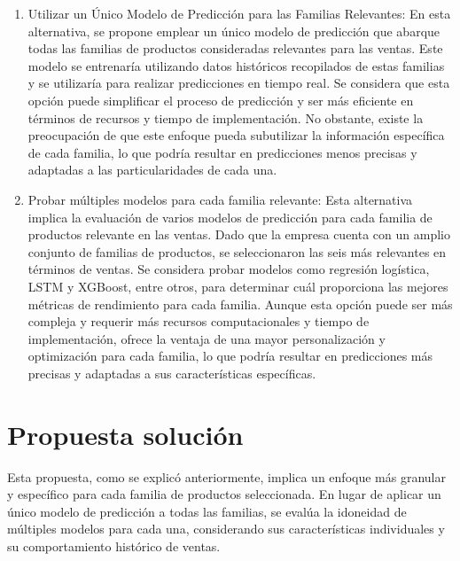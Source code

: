 \begin{enumerate}
	\item Utilizar un Único Modelo de Predicción para las Familias Relevantes: En esta alternativa, se propone emplear un único modelo de predicción que abarque todas las familias de productos consideradas relevantes para las ventas. Este modelo se entrenaría utilizando datos históricos recopilados de estas familias y se utilizaría para realizar predicciones en tiempo real. Se considera que esta opción puede simplificar el proceso de predicción y ser más eficiente en términos de recursos y tiempo de implementación. No obstante, existe la preocupación de que este enfoque pueda subutilizar la información específica de cada familia, lo que podría resultar en predicciones menos precisas y adaptadas a las particularidades de cada una.
	
	\item Probar múltiples modelos para cada familia relevante: Esta alternativa implica la evaluación de varios modelos de predicción para cada familia de productos relevante en las ventas. Dado que la empresa cuenta con un amplio conjunto de familias de productos, se seleccionaron las seis más relevantes en términos de ventas. Se considera probar modelos como regresión logística, LSTM y XGBoost, entre otros, para determinar cuál proporciona las mejores métricas de rendimiento para cada familia. Aunque esta opción puede ser más compleja y requerir más recursos computacionales y tiempo de implementación, ofrece la ventaja de una mayor personalización y optimización para cada familia, lo que podría resultar en predicciones más precisas y adaptadas a sus características específicas.
\end{enumerate}




\section{Propuesta solución}
Esta propuesta, como se explicó anteriormente, implica un enfoque más granular y específico para cada familia de productos seleccionada. En lugar de aplicar un único modelo de predicción a todas las familias, se evalúa la idoneidad de múltiples modelos para cada una, considerando sus características individuales y su comportamiento histórico de ventas.

